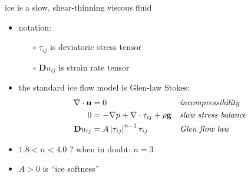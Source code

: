 \documentclass{beamer}
\begin{document}
\begin{frame}{ice is a slow, shear-thinning viscous fluid}

\begin{itemize}
\item notation:
  \begin{itemize}
  \item[$\circ$] $\tau_{ij}$ is deviatoric stress tensor
  \item[$\circ$] $\mathbf{D}u_{ij}$ is strain rate tensor
  \end{itemize}
\smallskip
\item the standard ice flow model is Glen-law Stokes:
\begin{align*}
\nabla \cdot \mathbf{u} &= 0 &&\text{\emph{incompressibility}} \\
0 &= - \nabla p + \nabla \cdot \tau_{ij} + \rho \mathbf{g} &&\text{\emph{slow stress balance}} \\
\mathbf{D}u_{ij} &= A \left|\tau_{ij}\right|^{n-1} \tau_{ij} &&\text{\emph{Glen flow law}}
\end{align*}
\item $1.8 < n < 4.0$ ?  \quad \alert{when in doubt: $n=3$}
\medskip
\item $A>0$ is ``ice softness''
\end{itemize}
\end{frame}

\end{document}
